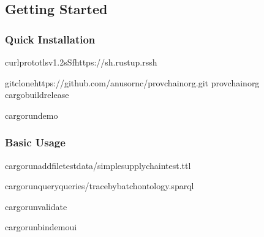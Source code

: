 \documentclass[letterpaper,10pt,english]{sphinxmanual}
\begin{document}
\subsection{Getting Started}
\label{\detokenize{overview/index:getting-started}}

\subsubsection{Quick Installation}
\label{\detokenize{overview/index:quick-installation}}
\begin{sphinxVerbatim}[commandchars=\\\{\}]
curl\PYGZhy{}\PYGZhy{}proto\PYGZhy{}\PYGZhy{}tlsv1.2\PYGZhy{}sSfhttps://sh.rustup.rssh

gitclonehttps://github.com/anusornc/provchain\PYGZhy{}org.git
provchain\PYGZhy{}org
cargobuild\PYGZhy{}\PYGZhy{}release

cargorundemo
\end{sphinxVerbatim}


\subsubsection{Basic Usage}
\label{\detokenize{overview/index:basic-usage}}
\begin{sphinxVerbatim}[commandchars=\\\{\}]
cargorun\PYGZhy{}\PYGZhy{}add\PYGZhy{}filetest\PYGZus{}data/simple\PYGZus{}supply\PYGZus{}chain\PYGZus{}test.ttl

cargorun\PYGZhy{}\PYGZhy{}queryqueries/trace\PYGZus{}by\PYGZus{}batch\PYGZus{}ontology.sparql

cargorun\PYGZhy{}\PYGZhy{}validate

cargorun\PYGZhy{}\PYGZhy{}bindemo\PYGZus{}ui
\end{sphinxVerbatim}
\end{document}
